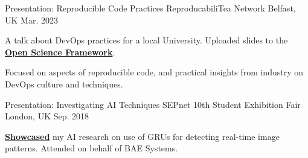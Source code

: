 
\begin{cventries}

  \cventry
  	{Presentation: Reproducible Code Practices} %
  	{ReproducabiliTea Network} %
    {Belfast, UK} %
    {Mar. 2023} %
   {
      \begin{cvitems} %
        \item A talk about DevOps practices for a local University. Uploaded slides to the \href{https://osf.io/yma2d}{\textbf{Open Science Framework}}.
        \item Focused on aspects of reproducible code, and practical insights from industry on DevOps culture and techniques.
      \end{cvitems}
    }

    
  \cventry
	{Presentation: Investigating AI Techniques}
    {SEPnet 10th Student Exhibition Fair} 
    {London, UK} %
    {Sep. 2018} %
    {
      \begin{cvitems} %
        \item \href{https://kiersz.dev/src/resources/bae-poster.pdf}{\textbf{Showcased}} my AI research on use of GRUs for detecting real-time image patterns. Attended on behalf of BAE Systems.
      \end{cvitems}
    }

\end{cventries}

